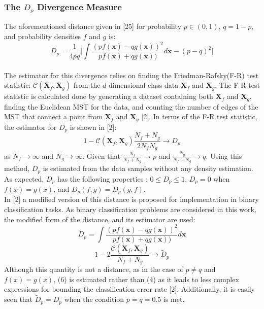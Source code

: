 \documentclass{article}
\begin{document}
	\subsubsection{\small The $D_p$ Divergence Measure}
	The aforementioned distance given in [25] for probability $p\in (0,1)$, $q=1-p$, and probability densities $f$ and $g$ is:
	\begin{equation}
			D_p=\frac{1}{4pq}\bigg[ \int \frac{(pf(\textbf{x})-qg(\textbf{x}))^2}{pf(\textbf{x})+qg(\textbf{x}))}d\textbf{x}-(p-q)^2 \bigg]
	\end{equation}
	\\[0.5ex]
	\indent The estimator for this divergence relies on finding the Friedman-Rafsky(F-R) test statistic: $\mathcal{C}(\textbf{X}_f,\textbf{X}_g)$ from the $d$-dimensional class data $\textbf{X}_f$ and $\textbf{X}_g$. The F-R test statistic is calculated done by generating a dataset containing both $\textbf{X}_f$ and $\textbf{X}_g$, finding the Euclidean MST for the data, and counting the number of edges of the MST that connect a point from $\textbf{X}_f$ and $\textbf{X}_g$ [2]. In terms of the F-R test statistic, the estimator for $D_p$ is shown in [2]:
	\begin{equation}
	1 - \mathcal{C}(\textbf{X}_f,\textbf{X}_g)\frac{N_f+N_g}{2N_f N_g} \rightarrow D_p
	\end{equation}
	as $N_f \rightarrow \infty$ and $N_g \rightarrow \infty$. Given that $\frac{N_f}{N_f+N_g} \rightarrow p$ and $\frac{N_g}{N_f+N_g} \rightarrow q$. Using this method, $D_p$ is estimated from the data samples without any density estimation. As expected, $D_p$ has the following properties : $0 \leq D_p \leq 1$, $D_p=0$ when $f(x)=g(x)$, and $D_p(f,g)=D_p(g,f)$. 
	\\[0.5ex]
	\indent In [2] a modified version of this distance is proposed for implementation in binary classification tasks. As binary classification problems are considered in this work, the modified form of the distance, and its estimator are used:
	\begin{equation}
		\widetilde{D}_p=\int \frac{(pf(\textbf{x})-qg(\textbf{x}))^2}{pf(\textbf{x})+qg(\textbf{x}))}d\textbf{x}
	\end{equation}
	\begin{equation}
	1 - 2 \frac{\mathcal{C}(\textbf{X}_f,\textbf{X}_g)}{N_f + N_g} \rightarrow \widetilde{D}_p
	\end{equation}
	Although this quantity is not a distance, as in the case of $p\neq q$ and $f(x)=g(x)$, (6) is estimated rather than (4) as it leads to less complex expressions for bounding the classification error rate [2]. Additionally, it is easily seen that $\widetilde{D}_p=D_p$ when the condition $p=q=0.5$ is met.
\end{document}
